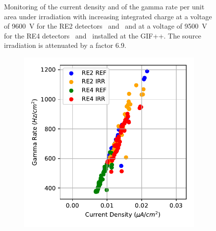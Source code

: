 \begin{figure}[H]
\begin{subfigure}{0.5\linewidth}
        	\caption{\label{fig:GIFpp-Source-mon:D}}
    	\end{subfigure}
		\caption{\label{fig:GIFpp-Source-mon} Monitoring of the current density and of the gamma rate per unit area under irradiation with increasing integrated charge at a voltage of \SI{9600}{V} for the RE2 detectors~ and~ and at a voltage of \SI{9500}{V} for the RE4 detectors~ and~ installed at the GIF++. The source irradiation is attenuated by a factor 6.9.}
	\end{figure}

	\begin{figure}[H]
    	\begin{subfigure}{0.5\linewidth}
    		\centering
			\includegraphics[width = \linewidth]{fig/chapt5/Gamma_rate-vs-Current_density.pdf}
        	\caption{\label{fig:GIFpp-J_R_correlation:A}}
    	\end{subfigure}
    	\begin{subfigure}{0.5\linewidth}
			\centering

\end{subfigure}
\end{figure}
